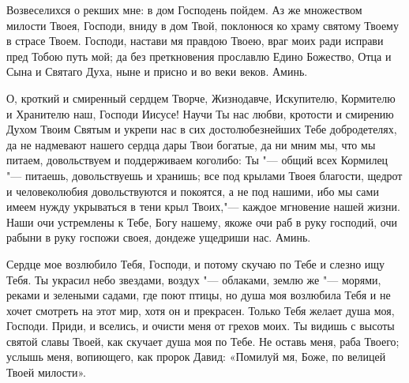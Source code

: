 \mychapterending


\begin{mymulticols}




Возвеселихся о рекших мне: в дом Господень пойдем. Аз же множеством милости Твоея, Господи, вниду в дом Твой, поклонюся ко храму святому Твоему в страсе Твоем. Господи, настави мя правдою Твоею, враг моих ради исправи пред Тобою путь мой; да без преткновения прославлю Едино Божество, Отца и Сына и Святаго Духа, ныне и присно и во веки веков. Аминь.

\end{mymulticols}

\mychapterending


\begin{mymulticols}



О, кроткий и смиренный сердцем Творче, Жизнодавче, Искупителю, Кормителю и Хранителю наш, Господи Иисусе! Научи Ты нас любви, кротости и смирению Духом Твоим Святым и укрепи нас в сих достолюбезнейших Тебе добродетелях, да не надмевают нашего сердца дары Твои богатые, да ни мним мы, что мы питаем, довольствуем и поддерживаем коголибо: Ты "--- общий всех Кормилец "--- питаешь, довольствуешь и хранишь; все под крылами Твоея благости, щедрот и человеколюбия довольствуются и покоятся, а не под нашими, ибо мы сами имеем нужду укрываться в тени крыл Твоих,"--- каждое мгновение нашей жизни. Наши очи устремлены к Тебе, Богу нашему, якоже очи раб в руку господий, очи рабыни в руку госпожи своея, дондеже ущедриши нас. Аминь.

\end{mymulticols}

\mychapterending


\begin{mymulticols}



Сердце мое возлюбило Тебя, Господи, и потому скучаю по Тебе и слезно ищу Тебя. Ты украсил небо звездами, воздух "--- облаками, землю же "--- морями, реками и зелеными садами, где поют птицы, но душа моя возлюбила Тебя и не хочет смотреть на этот мир, хотя он и прекрасен. Только Тебя желает душа моя, Господи. Приди, и вселись, и очисти меня от грехов моих. Ты видишь с высоты святой славы Твоей, как скучает душа моя по Тебе. Не оставь меня, раба Твоего; услышь меня, вопиющего, как пророк Давид: «Помилуй мя, Боже, по велицей Твоей милости».

\end{mymulticols}

